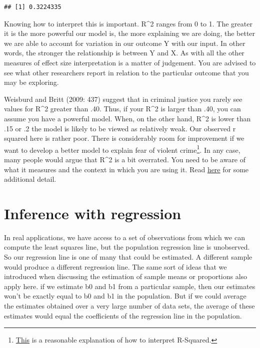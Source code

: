 \documentclass[]{book}
\begin{document}
\begin{verbatim}
## [1] 0.3224335
\end{verbatim}

Knowing how to interpret this is important. R\^{}2 ranges from 0 to 1. The greater it is the more powerful our model is, the more explaining we are doing, the better we are able to account for variation in our outcome Y with our input. In other words, the stronger the relationship is between Y and X. As with all the other measures of effect size interpretation is a matter of judgement. You are advised to see what other researchers report in relation to the particular outcome that you may be exploring.

Weisburd and Britt (2009: 437) suggest that in criminal justice you rarely see values for R\^{}2 greater than .40. Thus, if your R\^{}2 is larger than .40, you can assume you have a powerful model. When, on the other hand, R\^{}2 is lower than .15 or .2 the model is likely to be viewed as relatively weak. Our observed r squared here is rather poor. There is considerably room for improvement if we want to develop a better model to explain fear of violent crime\footnote{\href{http://blog.minitab.com/blog/adventures-in-statistics/regression-analysis-how-do-i-interpret-r-squared-and-assess-the-goodness-of-fit}{This} is a reasonable explanation of how to interpret R-Squared.}. In any case, many people would argue that R\^{}2 is a bit overrated. You need to be aware of what it measures and the context in which you are using it. Read \href{http://blog.minitab.com/blog/adventures-in-statistics/how-high-should-r-squared-be-in-regression-analysis}{here} for some additional detail.

\hypertarget{inference-with-regression}{%
\section{Inference with regression}\label{inference-with-regression}}

In real applications, we have access to a set of observations from which we can compute the least squares line, but the population regression line is unobserved. So our regression line is one of many that could be estimated. A different sample would produce a different regression line. The same sort of ideas that we introduced when discussing the estimation of sample means or proportions also apply here. if we estimate b0 and b1 from a particular sample, then our estimates won't be exactly equal to b0 and b1 in the population. But if we could average the estimates obtained over a very large number of data sets, the average of these estimates would equal the coefficients of the regression line in the population.
\end{document}

